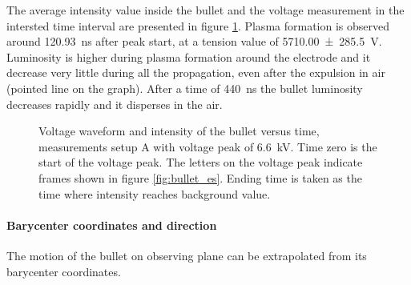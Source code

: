 The average intensity value inside the bullet and the voltage measurement in the intersted time interval are presented in figure \ref{fig:elio_d035_I}. Plasma formation is observed around \SI{120.93}{\nano\second} after peak start, at a tension value of \SI{5710.00(28550)}{\volt}. %
Luminosity is higher during plasma formation around the electrode and it decrease very little during all the propagation, even after the expulsion in air (pointed line on the graph). After a time of \SI{440}{\nano\second} the bullet luminosity decreases rapidly and it disperses in the air.
\begin{figure}
 \centering
 \hfill
 \caption{Voltage waveform and intensity of the bullet versus time, measurements setup A with voltage peak of \SI{6.6}{\kilo\volt}. Time zero is the start of the voltage peak. The letters on the voltage peak indicate frames shown in figure \ref{fig:bullet_es}. Ending time is taken as the time where intensity reaches background value.}
 \label{fig:elio_d035_I}
\end{figure}

\paragraph{Barycenter coordinates and direction}
The motion of the bullet on observing plane can be extrapolated from its barycenter coordinates.

